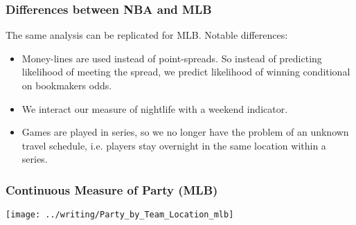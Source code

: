\documentclass{beamer}
\begin{document}
\begin{frame}   \frametitle{Differences between NBA and MLB}
  The same analysis can be replicated for MLB. Notable differences:
  \vspace{12pt}  
  \begin{itemize}     
    \item Money-lines are used instead of point-spreads. 
      So instead of predicting likelihood of meeting the spread,
      we predict likelihood of winning conditional on bookmakers odds.
    \item We interact our measure of nightlife with a weekend indicator.
    \item Games are played in series, so we no longer have the problem of an unknown travel schedule, i.e. players stay overnight in the same location within a series.   \end{itemize} \end{frame}

\begin{frame}   
  \frametitle{Continuous Measure of Party (MLB)}
  \centering \texttt{[image: ../writing/Party\_by\_Team\_Location\_mlb]}   
\end{frame}
\end{document}
